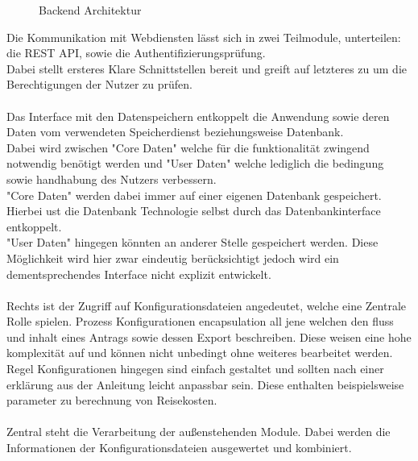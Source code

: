 \begin{figure}[h]
    
    \caption{Backend Architektur}\label{fig:BackendArch}
\end{figure}

Die Kommunikation mit Webdiensten lässt sich in zwei Teilmodule, unterteilen: die \ac{REST} \ac{API},
sowie die Authentifizierungsprüfung.\\
Dabei stellt ersteres Klare Schnittstellen bereit und greift auf letzteres zu um die Berechtigungen der Nutzer zu prüfen.\\
\\
Das Interface mit den Datenspeichern entkoppelt die Anwendung sowie deren Daten vom verwendeten Speicherdienst beziehungsweise
Datenbank.\\
Dabei wird zwischen "Core Daten" welche für die funktionalität zwingend notwendig benötigt werden
und "User Daten" welche lediglich die bedingung sowie handhabung des Nutzers verbessern.\\
"Core Daten" werden dabei immer auf einer eigenen Datenbank gespeichert.
Hierbei ust die Datenbank Technologie selbst durch das Datenbankinterface entkoppelt.\\
"User Daten" hingegen könnten an anderer Stelle gespeichert werden.
Diese Möglichkeit wird hier zwar eindeutig berücksichtigt jedoch wird ein dementsprechendes Interface nicht explizit entwickelt.
\\\\
Rechts ist der Zugriff auf Konfigurationsdateien angedeutet, welche eine Zentrale Rolle spielen.
Prozess Konfigurationen encapsulation all jene welchen den fluss und inhalt eines Antrags sowie dessen Export beschreiben.
Diese weisen eine hohe komplexität auf und können nicht unbedingt ohne weiteres bearbeitet werden.
Regel Konfigurationen hingegen sind einfach gestaltet und sollten nach einer erklärung aus der Anleitung leicht anpassbar sein.
Diese enthalten beispielsweise parameter zu berechnung von Reisekosten.
\\\\
Zentral steht die Verarbeitung der außenstehenden Module.
Dabei werden die Informationen der Konfigurationsdateien ausgewertet und kombiniert.